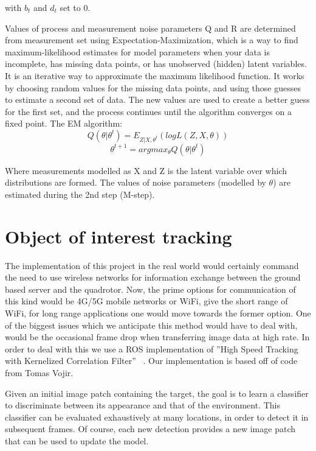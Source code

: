 	with $b_t$ and $d_t$ set to 0.
	
	Values of process and measurement noise parameters Q and R are determined from measurement set using Expectation-Maximization, which is a way to find
	maximum-likelihood estimates for model parameters when your data is incomplete, has missing data points, or has unobserved (hidden) latent variables. It is an iterative way to approximate the maximum likelihood function. It works by choosing random values for the missing data points, and using those guesses to estimate a second set of data. The new values are used to create a better guess for the first set, and the process continues until the algorithm converges on
	a fixed point. The EM algorithm:
	\begin{equation}Q(\theta|\theta^{t}) = E_{Z|X, \theta^{t}}(logL(Z,X,\theta))\end{equation}
	\begin{equation}\theta^{t+1} = argmax_{\theta}Q(\theta|\theta^{t})\end{equation}
	
	Where measurements modelled as X and Z is the latent variable over which distributions are formed. The values of noise parameters (modelled by $\theta$) are estimated during the 2nd step (M-step).
	
	\newpage
	\section{Object of interest tracking}
	\label{sec:Object of interest tracking}

	The implementation of this project in the real world would certainly command the need to use wireless networks for information exchange between the ground based server and the quadrotor. Now, the prime options for communication
	of this kind would be 4G/5G mobile networks or WiFi, give the short range of WiFi, for long range applications one would move towards the former option. One of the biggest issues which we anticipate this method would have to deal with, would be the occasional frame drop when transferring image data at high rate. In order to deal with this we use a ROS implementation of ”High Speed Tracking with Kernelized Correlation Filter” ~\cite{henriques2015high}. Our implementation is based off of code from Tomas Vojir.~\cite{kcf}
	
	Given an initial image patch containing the target, the goal is to learn a classifier to discriminate between its appearance and that of the environment. This classifier can be evaluated exhaustively  at  many  locations,  in  order  to  detect  it  in
	subsequent frames. Of course, each new detection provides a new image patch that can be used to update the model.
	
